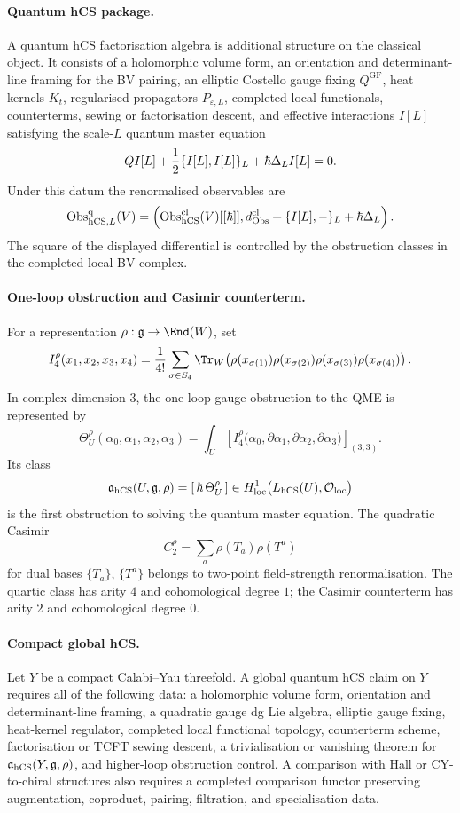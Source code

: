 \paragraph{Quantum hCS package.}
A quantum hCS factorisation algebra is additional structure on the
classical object. It consists of a holomorphic volume form, an
orientation and determinant-line framing for the BV pairing, an elliptic
Costello gauge fixing \(Q^{\mathrm{GF}}\), heat kernels \(K_t\),
regularised propagators \(P_{\varepsilon,L}\), completed local
functionals, counterterms, sewing or factorisation descent, and
effective interactions \(I[L]\) satisfying the scale-\(L\) quantum
master equation
\[
  QI[L]+\frac12\{I[L],I[L]\}_L+\hbar\Delta_L I[L]=0.
\]
Under this datum the renormalised observables are
\[
  \mathrm{Obs}^{\mathrm{q}}_{\mathrm{hCS},L}(V)
  =
  \left(
    \mathrm{Obs}^{\mathrm{cl}}_{\mathrm{hCS}}(V)[[\hbar]],
    d_{\mathrm{Obs}}^{\mathrm{cl}}+\{I[L],-\}_L+\hbar\Delta_L
  \right).
\]
The square of the displayed differential is controlled by the
obstruction classes in the completed local BV complex.

\paragraph{One-loop obstruction and Casimir counterterm.}
For a representation \(\rho:\g\to\End(W)\), set
\[
  I_4^\rho(x_1,x_2,x_3,x_4)
  =
  \frac1{4!}\sum_{\sigma\in S_4}
  \Tr_W\!
  \left(
    \rho(x_{\sigma(1)})\rho(x_{\sigma(2)})
    \rho(x_{\sigma(3)})\rho(x_{\sigma(4)})
  \right).
\]
In complex dimension \(3\), the one-loop gauge obstruction to the QME is
represented by
\[
  \Theta^\rho_U(\alpha_0,\alpha_1,\alpha_2,\alpha_3)
  =
  \int_U
  \left[
  I_4^\rho\bigl(
    \alpha_0,\partial\alpha_1,\partial\alpha_2,\partial\alpha_3
  \bigr)
  \right]_{(3,3)}.
\]
Its class
\[
  \mathfrak a_{\mathrm{hCS}}(U,\mathfrak{g},\rho)
  =
  [\,\hbar\,\Theta^\rho_U\,]
  \in
  H^1_{\mathrm{loc}}
  \bigl(L_{\mathrm{hCS}}(U),\mathcal{O}_{\mathrm{loc}}\bigr)
\]
is the first obstruction to solving the quantum master equation. The
quadratic Casimir
\[
  C_2^\rho=\sum_a\rho(T_a)\rho(T^a)
\]
for dual bases \(\{T_a\}\), \(\{T^a\}\) belongs to two-point
field-strength renormalisation. The quartic class has arity \(4\) and
cohomological degree \(1\); the Casimir counterterm has arity \(2\) and
cohomological degree \(0\).

\paragraph{Compact global hCS.}
Let \(Y\) be a compact Calabi--Yau threefold. A global quantum hCS claim
on \(Y\) requires all of the following data: a holomorphic volume form,
orientation and determinant-line framing, a quadratic gauge dg Lie
algebra, elliptic gauge fixing, heat-kernel regulator, completed local
functional topology, counterterm scheme, factorisation or TCFT sewing
descent, a trivialisation or vanishing theorem for
\(\mathfrak a_{\mathrm{hCS}}(Y,\mathfrak{g},\rho)\), and higher-loop obstruction control.
A comparison with Hall or CY-to-chiral structures also requires a
completed comparison functor preserving augmentation, coproduct,
pairing, filtration, and specialisation data.

